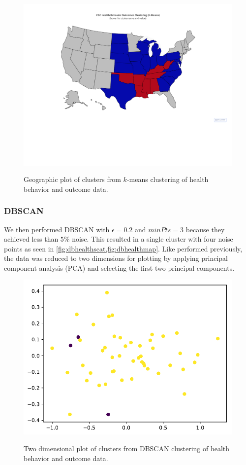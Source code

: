 \documentclass{article}
\begin{document}
\begin{figure}[h]
\centering
\caption{Geographic plot of clusters from $k$-means clustering of health behavior and outcome data.}
\includegraphics[width=\linewidth]{images/cdc_health_behavior_and_outcomes_kmeans_map.pdf}
\label{fig:kmeanshealthmap}
\end{figure}

\subsubsection{DBSCAN}
We then performed DBSCAN with $\epsilon = 0.2$ and $minPts = 3$ because they achieved less than $5\%$ noise. This resulted in a single cluster with four noise points as seen in \cref{fig:dbhealthscat,fig:dbhealthmap}. Like performed previously, the data was reduced to two dimensions for plotting by applying principal component analysis (PCA) and selecting the first two principal components.

\begin{figure}[h]
\centering
\caption{Two dimensional plot of clusters from DBSCAN clustering of health behavior and outcome data.}
\includegraphics[width=\linewidth]{images/cdc_health_behavior_and_outcomes_dbscan_2d_plot.pdf}
\label{fig:dbhealthscat}
\end{figure}
\end{document}

